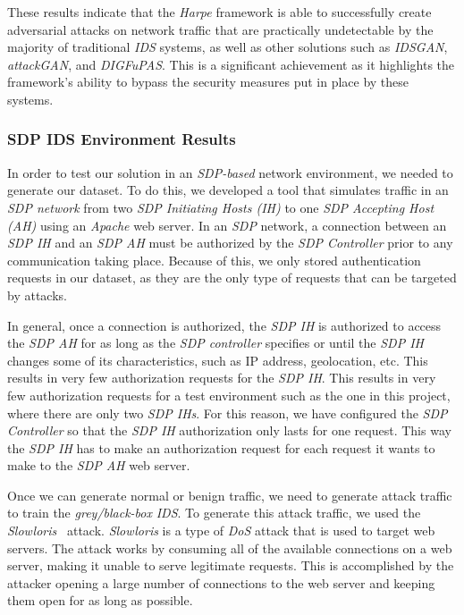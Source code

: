 These results indicate that the \textit{Harpe} framework is able to successfully create adversarial attacks on network
traffic that are practically undetectable by the majority of traditional \textit{IDS} systems,
as well as other solutions such as \textit{IDSGAN}, \textit{attackGAN}, and \textit{DIGFuPAS}.
This is a significant achievement as it highlights the framework's ability to bypass the security measures put in place
by these systems.

\subsubsection{SDP IDS Environment Results}
In order to test our solution in an \textit{SDP-based} network environment, we needed to generate our dataset.
To do this, we developed a tool that simulates traffic in an \textit{SDP network} from two
\textit{SDP Initiating Hosts (IH)} to one \textit{SDP Accepting Host (AH)} using an \textit{Apache} web server.
In an \textit{SDP} network, a connection between an \textit{SDP IH} and an \textit{SDP AH} must be authorized by the
\textit{SDP Controller} prior to any communication taking place.
Because of this, we only stored authentication requests in our dataset, as they are the only type of requests that can
be targeted by attacks.

In general, once a connection is authorized, the \textit{SDP IH} is authorized to access the \textit{SDP AH} for as
long as the \textit{SDP controller} specifies or until the \textit{SDP IH} changes some of its characteristics, such as
IP address, geolocation, etc.
This results in very few authorization requests for the \textit{SDP IH}.
This results in very few authorization requests for a test environment such as the one in this project, where there are
only two \textit{SDP IHs}.
For this reason, we have configured the \textit{SDP Controller} so that the \textit{SDP IH} authorization only lasts
for one request.
This way the \textit{SDP IH} has to make an authorization request for each request it wants to make to the
\textit{SDP AH} web server.

Once we can generate normal or benign traffic, we need to generate attack traffic to train the \textit{grey/black-box}
\textit{IDS}.
To generate this attack traffic, we used the \textit{Slowloris}~\cite{damon2012hands} attack.
\textit{Slowloris} is a type of \textit{DoS} attack that is used to target web servers.
The attack works by consuming all of the available connections on a web server, making it unable to serve legitimate
requests.
This is accomplished by the attacker opening a large number of connections to the web server and keeping them open for
as long as possible.

